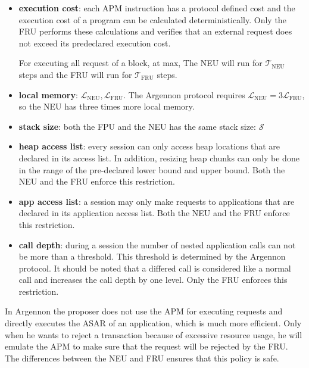 \begin{itemize}
    \item \textbf{execution cost}:
    each APM instruction has a protocol defined cost and the execution cost of a program can be calculated
    deterministically. Only the FRU performs these calculations and verifies that an external request does not exceed
    its predeclared execution cost.

    For executing all request of a block, at max, The NEU will run for
    $\mathcal{T}_{\text{NEU}}$ steps and the FRU will run for
    $\mathcal{T}_{\text{FRU}}$ steps.

    \item \textbf{local memory}: $\mathcal{L}_{\text{NEU}}, \mathcal{L}_{\text{FRU}}$. The Argennon protocol requires
    $\mathcal{L}_{\text{NEU}} = 3\mathcal{L}_{\text{FRU}}$, so the NEU has three times more local memory.

    \item \textbf{stack size}: both the FPU and the NEU has the same stack size: $\mathcal{S}$

    \item \textbf{heap access list}:
    every session can only access heap locations that are declared in its access list. In addition,
    resizing heap chunks can only be done in the range of the pre-declared lower bound and upper bound. Both the NEU
    and the FRU enforce this restriction.
    \item \textbf{app access list}:
    a session may only make requests to applications that are declared in its application access list. Both the NEU
    and the FRU enforce this restriction.
    \item \textbf{call depth}:
    during a session the number of nested application calls can not be more than a threshold. This threshold is
    determined by the Argennon protocol. It should be noted that a differed call is considered like a normal call and
    increases the call depth by one level. Only the FRU enforces this restriction.
\end{itemize}

In Argennon the proposer does not use the APM for executing requests and directly executes the ASAR of an
application, which is much more efficient. Only when he wants to reject a transaction because of excessive resource
usage, he will emulate the APM to make sure that the request will be rejected by the FRU. The differences between the
NEU and FRU ensures that this policy is safe.